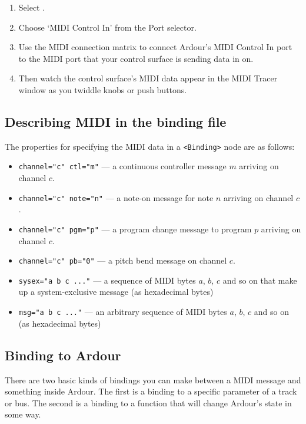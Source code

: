 \documentclass[10pt,a4paper]{book}
\newcommand{\menu}[1]{\emph{\StrSubstitute{#1}{,}{ $\rightarrow$ }}}
\begin{document}
{\begin{enumerate}
\item Select \menu{Window,MIDI Tracer}.
\item Choose `MIDI Control In' from the Port selector.
\item Use the MIDI connection matrix to connect Ardour's
MIDI Control In port to the MIDI port that your control surface is
sending data in on.
\item Then watch the control surface's MIDI data appear
in the MIDI Tracer window as you twiddle knobs or push buttons.
\end{enumerate}


\subsection{Describing MIDI in the binding file}

The properties for specifying the MIDI data in a \texttt{<Binding>}
node are as follows:

\begin{itemize}
\item \texttt{channel="c" ctl="m"} --- a continuous controller message $m$ arriving on channel $c$.
\item \texttt{channel="c" note="n"} --- a note-on message for note $n$ arriving on channel $c$.
\item \texttt{channel="c" pgm="p"} --- a program change message to program $p$ arriving on channel $c$.
\item \texttt{channel="c" pb="0"} --- a pitch bend message on channel $c$.
\item \texttt{sysex="a b c ..."} --- a sequence of MIDI bytes $a$, $b$, $c$ and so on that make up a system-exclusive message (as hexadecimal bytes)
\item \texttt{msg="a b c ..."} --- an arbitrary sequence of MIDI bytes $a$, $b$, $c$ and so on (as hexadecimal bytes)
\end{itemize}

\subsection{Binding to Ardour}

There are two basic kinds of bindings you can make between a MIDI
message and something inside Ardour. The first is a binding to a
specific parameter of a track or bus. The second is a binding to a
function that will change Ardour's state in some way. 


}
\end{document}
